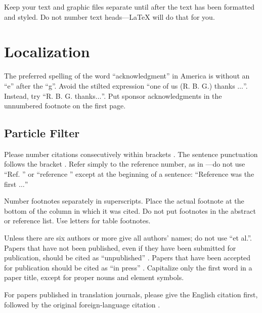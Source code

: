 \documentclass[conference]{IEEEtran}
\begin{document}
Keep your text and graphic files separate until after the text has been 
formatted and styled. Do not number text heads---{\LaTeX} will do that 
for you.


\section*{Localization}

The preferred spelling of the word ``acknowledgment'' in America is without 
an ``e'' after the ``g''. Avoid the stilted expression ``one of us (R. B. 
G.) thanks $\ldots$''. Instead, try ``R. B. G. thanks$\ldots$''. Put sponsor 
acknowledgments in the unnumbered footnote on the first page.

\subsection*{Particle Filter}

Please number citations consecutively within brackets \cite{b1}. The 
sentence punctuation follows the bracket \cite{b2}. Refer simply to the reference 
number, as in \cite{b3}---do not use ``Ref. \cite{b3}'' or ``reference \cite{b3}'' except at 
the beginning of a sentence: ``Reference \cite{b3} was the first $\ldots$''

Number footnotes separately in superscripts. Place the actual footnote at 
the bottom of the column in which it was cited. Do not put footnotes in the 
abstract or reference list. Use letters for table footnotes.

Unless there are six authors or more give all authors' names; do not use 
``et al.''. Papers that have not been published, even if they have been 
submitted for publication, should be cited as ``unpublished'' \cite{b4}. Papers 
that have been accepted for publication should be cited as ``in press'' \cite{b5}. 
Capitalize only the first word in a paper title, except for proper nouns and 
element symbols.

For papers published in translation journals, please give the English 
citation first, followed by the original foreign-language citation \cite{b6}.
\end{document}
